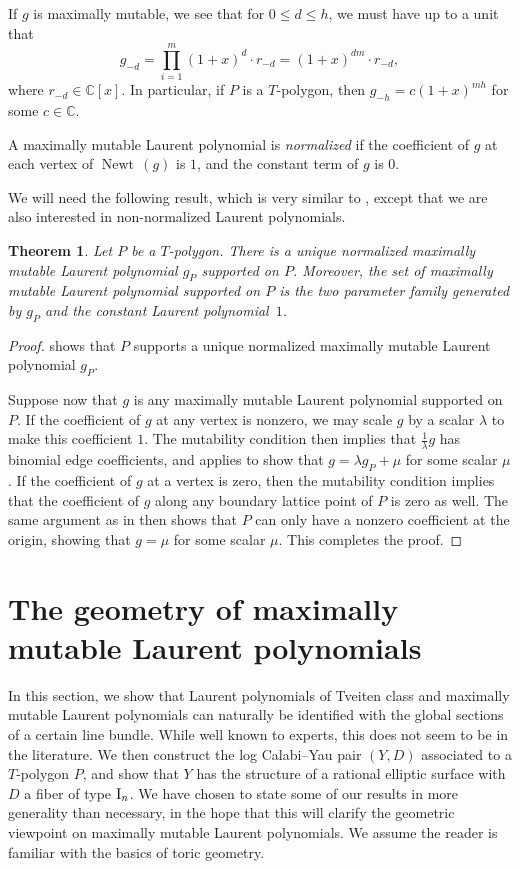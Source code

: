 \documentclass[pdftex]{sigma}
\numberwithin{equation}{section}
\newtheorem{Theorem}{Theorem}[section]
\DeclareMathOperator{\Newt}{{Newt \,}}
\newcommand{\CC}{\mathbb{C}}
\begin{document}
If $g$ is maximally mutable, we see that for $0 \leq d \leq h$, we must have up to a unit that
	\[
	g_{-d}=\prod_{i=1}^m (1+x)^{d} \cdot r_{-d}=(1+x)^{dm} \cdot r_{-d},
	\]
	where $r_{-d} \in \CC[x]$. In particular, if $P$ is a $T$-polygon, then $g_{-h}=c(1+x)^{mh}$ for some $c \in \CC$.
		\begin{Definition}\label{def:normalized}
		A maximally mutable Laurent polynomial is \emph{normalized} if the coefficient of $g$ at each vertex of $\Newt(g)$ is $1$, and the constant term of $g$ is $0$.
	\end{Definition}
We will need the following result, which is very similar to \cite[Proposition 3.7]{Coates2021}, except that we are also interested in non-normalized Laurent polynomials.
\begin{Theorem}\label{thm:MMLP}
	Let $P$ be a $T$-polygon. There is a unique normalized maximally mutable Laurent polynomial $g_P$ supported on $P$. Moreover, the set of maximally mutable Laurent polynomial supported on $P$ is the two parameter family generated by $g_P$ and
	the constant Laurent polynomial~$1$.
\end{Theorem}
\begin{proof}
\cite[Proposition 3.7]{Coates2021} shows that $P$ supports a unique normalized maximally mutable Laurent polynomial $g_P$.

Suppose now that $g$ is any maximally mutable Laurent polynomial supported on $P$. If the coefficient of $g$ at any vertex is nonzero, we may scale $g$ by a scalar $\lambda$ to make this coefficient $1$. The mutability condition then implies that $\tfrac{1}{\lambda}g$ has binomial edge coefficients, and \cite[Proposition~3.7]{Coates2021} applies to show that $g=\lambda g_P+\mu$ for some scalar $\mu$.
If the coefficient of $g$ at a vertex is zero, then the mutability condition implies that the coefficient of $g$ along any boundary lattice point of $P$ is zero as well. The same argument as in \cite[Proposition 3.7]{Coates2021} then shows that $P$ can only have a nonzero coefficient at the origin, showing that $g=\mu$ for some scalar $\mu$. This completes the proof.
\end{proof}

	\section{The geometry of maximally mutable Laurent polynomials}\label{sec:geometry}
In this section, we show that Laurent polynomials of Tveiten class and maximally mutable Laurent polynomials can naturally be identified with the global sections of a certain line bundle. While well known to experts, this does not seem to be in the literature.
We then construct the log Calabi--Yau pair $(Y, D)$ associated to a $T$-polygon $P$, and show that $Y$ has the structure of a rational elliptic surface with $D$ a fiber of type ${\rm I}_n$. We have chosen to state some of our results in more generality than necessary, in the hope that this will clarify the geometric viewpoint on maximally mutable Laurent polynomials. We assume the reader is familiar with the basics of toric geometry.
\end{document}
